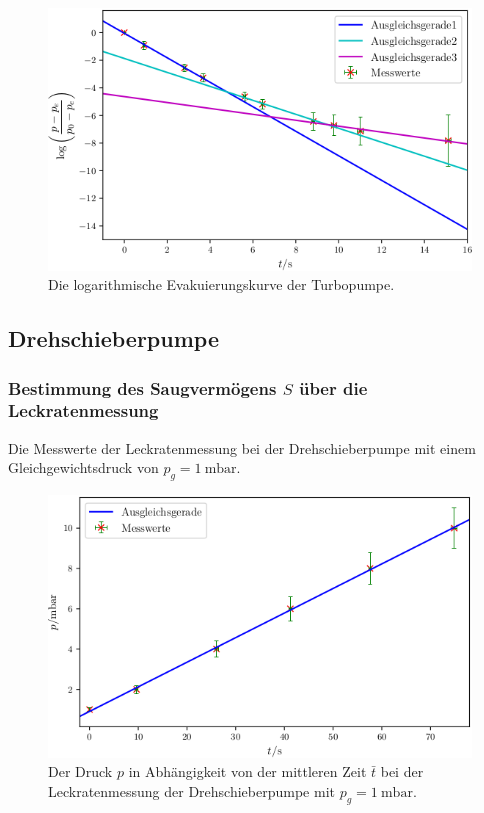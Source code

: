 \begin{figure}
\centering
\includegraphics[width=\linewidth-70pt,height=\textheight-70pt,keepaspectratio]{content/images/TSL.png}
\caption{Die logarithmische Evakuierungskurve der Turbopumpe.}
\label{fig:TSL}
\end{figure}

\subsection{Drehschieberpumpe}

\subsubsection{Bestimmung des Saugvermögens $S$ über die Leckratenmessung}

\begin{table}
\centering
\caption{Die Messwerte der Leckratenmessung bei der Drehschieberpumpe mit einem Gleichgewichtsdruck von $p_g = \SI{1}{\milli\bar}$.}

\label{tab:DL1}
\end{table}

\begin{figure}
\centering
\includegraphics[width=\linewidth-70pt,height=\textheight-70pt,keepaspectratio]{content/images/DL1.png}
\caption{Der Druck $p$ in Abhängigkeit von der mittleren Zeit $\bar{t}$ bei der Leckratenmessung der Drehschieberpumpe  mit $p_g = \SI{1}{\milli\bar}$.}
\label{fig:DL1}
\end{figure}

